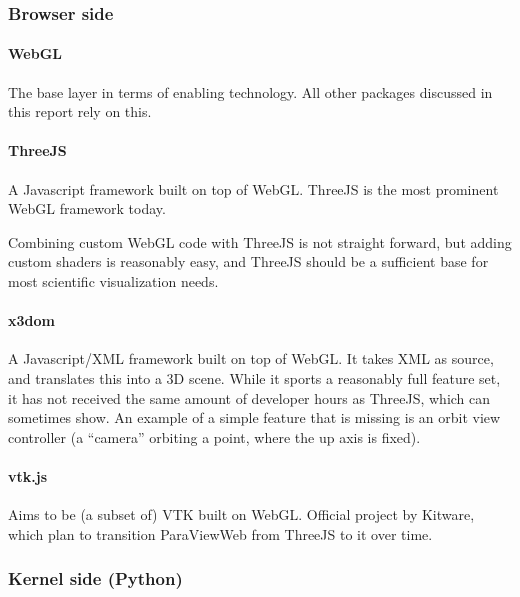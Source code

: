     \hypertarget{browser-side}{%
\subsubsection{Browser side}\label{browser-side}}

    \hypertarget{webgl}{%
\paragraph{WebGL}\label{webgl}}

The base layer in terms of enabling technology. All other packages
discussed in this report rely on this.

    \hypertarget{threejs}{%
\paragraph{ThreeJS}\label{threejs}}

A Javascript framework built on top of WebGL. ThreeJS is the most
prominent WebGL framework today.

Combining custom WebGL code with ThreeJS is not straight forward, but
adding custom shaders is reasonably easy, and ThreeJS should be a
sufficient base for most scientific visualization needs.

    \hypertarget{x3dom}{%
\paragraph{x3dom}\label{x3dom}}

A Javascript/XML framework built on top of WebGL. It takes XML as
source, and translates this into a 3D scene. While it sports a
reasonably full feature set, it has not received the same amount of
developer hours as ThreeJS, which can sometimes show. An example of a
simple feature that is missing is an orbit view controller (a ``camera''
orbiting a point, where the up axis is fixed).

    \hypertarget{vtk.js}{%
\paragraph{vtk.js}\label{vtk.js}}

Aims to be (a subset of) VTK built on WebGL. Official project by
Kitware, which plan to transition ParaViewWeb from ThreeJS to it over
time.

    \hypertarget{kernel-side-python}{%
\subsubsection{Kernel side (Python)}\label{kernel-side-python}}

